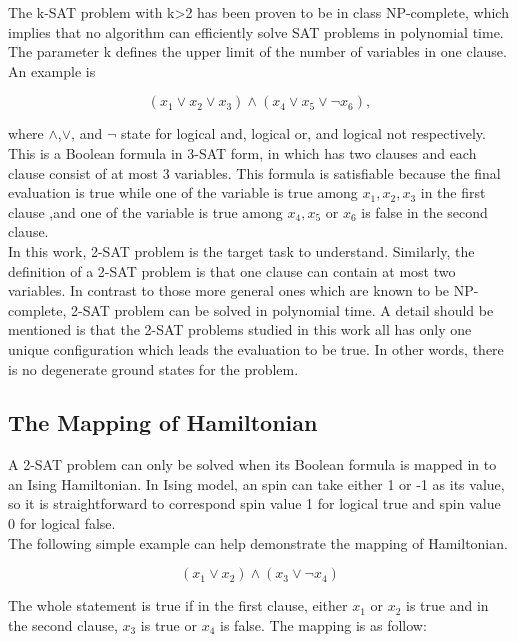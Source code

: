 \documentclass[twoside,a4paper,article]{combine}
\begin{document}
The k-SAT problem with k>2 has been proven to be in class NP-complete, which implies that no algorithm can efficiently solve SAT problems in polynomial time. The parameter k defines the upper limit of the number of variables in one clause. An example is 

\begin{equation*}
 (x_1\lor x_2\lor x_3)\land (x_4\lor x_5\lor \neg x_6),
\end{equation*}

where $\land$,$\lor$, and $\neg$ state for logical and, logical or, and logical not respectively. This is a Boolean formula in 3-SAT form, in which has two clauses and each clause consist of at most 3 variables. This formula is satisfiable because the final evaluation is true while one of the variable is true among $x_1, x_2, x_3$ in the first clause ,and one of the variable is true among $x_4, x_5$ or $x_6$ is false in the second clause. \\

In this work, 2-SAT problem is the target task to understand. Similarly, the definition of a 2-SAT problem is that one clause can contain at most two variables. In contrast to those more general ones which are known to be NP-complete, 2-SAT problem can be solved in polynomial time. A detail should be mentioned is that the 2-SAT problems studied in this work all has only one unique configuration which leads the evaluation to be true. In other words, there is no degenerate ground states for the problem. \\
 
\subsection{The Mapping of Hamiltonian}

A 2-SAT problem can only be solved when its Boolean formula is mapped in to an Ising Hamiltonian. In Ising model, an spin can take either 1 or -1 as its value, so it is straightforward to correspond spin value 1 for logical true and spin value 0 for logical false. \\

The following simple example can help demonstrate the mapping of Hamiltonian. 

\begin{equation*}
(x_1\lor x_2)\land (x_3\lor \neg x_4)
\end{equation*}

The whole statement is true if in the first clause, either $x_1$ or $x_2$ is true and in the second clause, $x_3$ is true or $x_4$ is false. The mapping is as follow:
\end{document}
